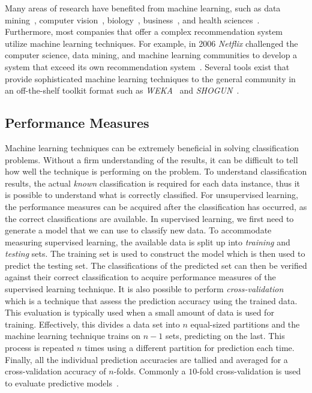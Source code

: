 Many areas of research have benefited from machine learning, such as data mining~\cite{WFH11}, computer vision~\cite{Her03}, biology~\cite{OLP08}, business~\cite{Her00}, and health sciences~\cite{Kon01}. Furthermore, most companies that offer a complex recommendation system utilize machine learning techniques. For example, in 2006 \emph{Netflix} challenged the computer science, data mining, and machine learning communities to develop a system that exceed its own recommendation system~\cite{BL07}. Several tools exist that provide sophisticated machine learning techniques to the general community in an off-the-shelf toolkit format such as \emph{WEKA}~\cite{HFH+09} and \emph{SHOGUN}~\cite{SRH+10}.


\subsection{Performance Measures}
\label{subsec:background_performance_measures}
Machine learning techniques can be extremely beneficial in solving classification problems. Without a firm understanding of the results, it can be difficult to tell how well the technique is performing on the problem. To understand classification results, the actual \emph{known} classification is required for each data instance, thus it is possible to understand what is correctly classified. For unsupervised learning, the performance measures can be acquired after the classification has occurred, as the correct classifications are available. In supervised learning, we first need to generate a model that we can use to classify new data. To accommodate measuring supervised learning, the available data is split up into \emph{training} and \emph{testing} sets. The training set is used to construct the model which is then used to predict the testing set. The classifications of the predicted set can then be verified against their correct classification to acquire performance measures of the supervised learning technique. It is also possible to perform \emph{cross-validation} which is a technique that assess the prediction accuracy using the trained data. This evaluation is typically used when a small amount of data is used for training. Effectively, this divides a data set into $n$ equal-sized partitions and the machine learning technique trains on $n-1$ sets, predicting on the last. This process is repeated $n$ times using a different partition for prediction each time. Finally, all the individual prediction accuracies are tallied and averaged for a cross-validation accuracy of $n$-folds. Commonly a $10$-fold cross-validation is used to evaluate predictive models~\cite{Koh95}.

